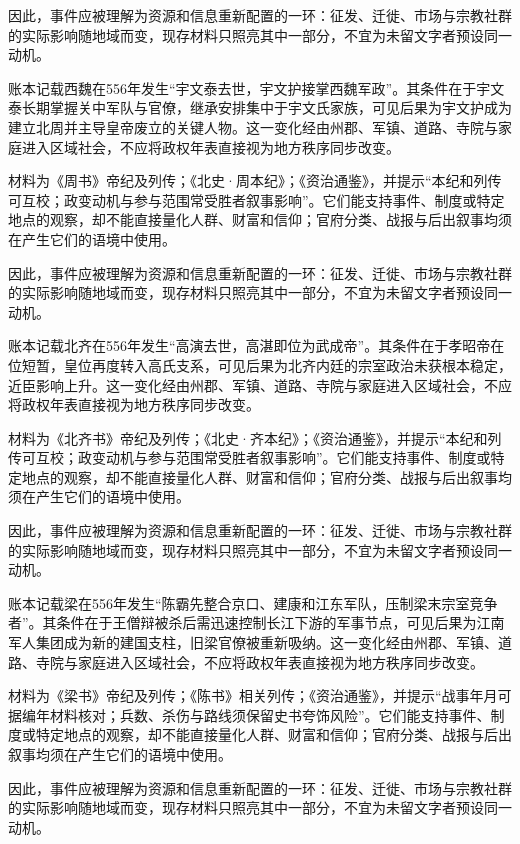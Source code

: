 因此，事件应被理解为资源和信息重新配置的一环：征发、迁徙、市场与宗教社群的实际影响随地域而变，现存材料只照亮其中一部分，不宜为未留文字者预设同一动机。

账本记载西魏在556年发生“宇文泰去世，宇文护接掌西魏军政”。其条件在于宇文泰长期掌握关中军队与官僚，继承安排集中于宇文氏家族，可见后果为宇文护成为建立北周并主导皇帝废立的关键人物。这一变化经由州郡、军镇、道路、寺院与家庭进入区域社会，不应将政权年表直接视为地方秩序同步改变。

材料为《周书》帝纪及列传；《北史·周本纪》；《资治通鉴》，并提示“本纪和列传可互校；政变动机与参与范围常受胜者叙事影响”。它们能支持事件、制度或特定地点的观察，却不能直接量化人群、财富和信仰；官府分类、战报与后出叙事均须在产生它们的语境中使用。

因此，事件应被理解为资源和信息重新配置的一环：征发、迁徙、市场与宗教社群的实际影响随地域而变，现存材料只照亮其中一部分，不宜为未留文字者预设同一动机。

账本记载北齐在556年发生“高演去世，高湛即位为武成帝”。其条件在于孝昭帝在位短暂，皇位再度转入高氏支系，可见后果为北齐内廷的宗室政治未获根本稳定，近臣影响上升。这一变化经由州郡、军镇、道路、寺院与家庭进入区域社会，不应将政权年表直接视为地方秩序同步改变。

材料为《北齐书》帝纪及列传；《北史·齐本纪》；《资治通鉴》，并提示“本纪和列传可互校；政变动机与参与范围常受胜者叙事影响”。它们能支持事件、制度或特定地点的观察，却不能直接量化人群、财富和信仰；官府分类、战报与后出叙事均须在产生它们的语境中使用。

因此，事件应被理解为资源和信息重新配置的一环：征发、迁徙、市场与宗教社群的实际影响随地域而变，现存材料只照亮其中一部分，不宜为未留文字者预设同一动机。

账本记载梁在556年发生“陈霸先整合京口、建康和江东军队，压制梁末宗室竞争者”。其条件在于王僧辩被杀后需迅速控制长江下游的军事节点，可见后果为江南军人集团成为新的建国支柱，旧梁官僚被重新吸纳。这一变化经由州郡、军镇、道路、寺院与家庭进入区域社会，不应将政权年表直接视为地方秩序同步改变。

材料为《梁书》帝纪及列传；《陈书》相关列传；《资治通鉴》，并提示“战事年月可据编年材料核对；兵数、杀伤与路线须保留史书夸饰风险”。它们能支持事件、制度或特定地点的观察，却不能直接量化人群、财富和信仰；官府分类、战报与后出叙事均须在产生它们的语境中使用。

因此，事件应被理解为资源和信息重新配置的一环：征发、迁徙、市场与宗教社群的实际影响随地域而变，现存材料只照亮其中一部分，不宜为未留文字者预设同一动机。

